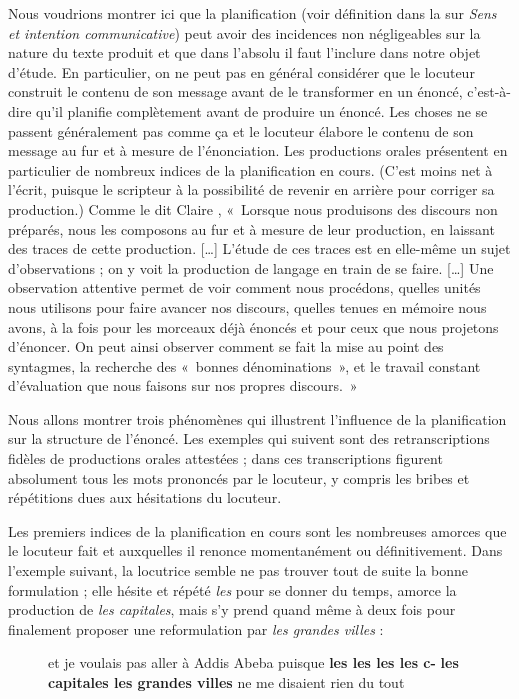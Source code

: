 Nous voudrions montrer ici que la planification (voir définition dans la  sur \textit{Sens et intention communicative}) peut avoir des incidences non négligeables sur la nature du texte produit et que dans l’absolu il faut l’inclure dans notre objet d’étude. En particulier, on ne peut pas en général considérer que le locuteur construit le contenu de son message avant de le transformer en un énoncé, c’est-à-dire qu’il planifie complètement avant de produire un énoncé. Les choses ne se passent généralement pas comme ça et le locuteur élabore le contenu de son message au fur et à mesure de l’énonciation. Les productions orales présentent en particulier de nombreux indices de la planification en cours. (C’est moins net à l’écrit, puisque le scripteur à la possibilité de revenir en arrière pour corriger sa production.) Comme le dit Claire \citet[17]{Blanche-Benveniste1990}, «~Lorsque nous produisons des discours non préparés, nous les composons au fur et à mesure de leur production, en laissant des traces de cette production. […] L’étude de ces traces est en elle-même un sujet d’observations ; on y voit la production de langage en train de se faire. […] Une observation attentive permet de voir comment nous procédons, quelles unités nous utilisons pour faire avancer nos discours, quelles tenues en mémoire nous avons, à la fois pour les morceaux déjà énoncés et pour ceux que nous projetons d’énoncer. On peut ainsi observer comment se fait la mise au point des syntagmes, la recherche des «~bonnes dénominations~», et le travail constant d’évaluation que nous faisons sur nos propres discours.~»

Nous allons montrer trois phénomènes qui illustrent l’influence de la planification sur la structure de l’énoncé. Les exemples qui suivent sont des retranscriptions fidèles de productions orales attestées ; dans ces transcriptions figurent absolument tous les mots prononcés par le locuteur, y compris les bribes et répétitions dues aux hésitations du locuteur.

Les premiers indices de la planification en cours sont les nombreuses amorces que le locuteur fait et auxquelles il renonce momentanément ou définitivement. Dans l’exemple suivant, la locutrice semble ne pas trouver tout de suite la bonne formulation ; elle hésite et répété \textit{les} pour se donner du temps, amorce la production de \textit{les capitales}, mais s’y prend quand même à deux fois pour finalement proposer une reformulation par \textit{les grandes villes} :

\begin{figure}
et je voulais pas aller à Addis Abeba puisque \textbf{les les les les c-} \textbf{les capitales les grandes villes} ne me disaient rien du tout
\end{figure}

